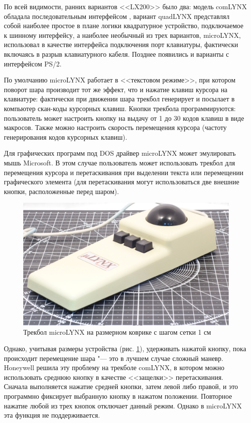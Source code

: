 \documentclass[11pt, a4paper]{article}
\begin{document}
По всей видимости, ранних вариантов <<LX200>> было два: модель comLYNX обладала последовательным интерфейсом \cite{comlynx}, вариант quadLYNX представлял собой наиболее простое в плане логики квадратурное устройство, подключаемое к шинному интерфейсу, а наиболее необычный из трех вариантов, microLYNX, использовал в качестве интерфейса подключения порт клавиатуры, фактически включаясь в разрыв клавиатурного кабеля. Позднее появились и варианты с интерфейсом PS/2.

По умолчанию microLYNX работает в <<текстовом режиме>>, при котором поворот шара производит тот же эффект, что и нажатие клавиш курсора на клавиатуре: фактически при движении шара трекбол генерирует и посылает в компьютер скан-коды курсорных клавиш. Кнопки трекбола программируются: пользователь может настроить кнопку на выдачу от 1 до 30 кодов клавиш в виде макросов. Также можно настроить скорость перемещения курсора (частоту генерирования кодов курсорных клавиш). 

Для графических программ под DOS драйвер microLYNX может эмулировать мышь Microsoft. В этом случае пользователь может использовать трекбол для перемещения курсора и перетаскивания при выделении текста или перемещении графического элемента (для перетаскивания могут использоваться две внешние кнопки, расположенные перед шаром).

\begin{figure}[h]
    \centering
    \includegraphics[scale=0.4]{1986_honeywell_microlynx_trackball/size.jpg}
    \caption{Трекбол microLYNX на размерном коврике с шагом сетки 1 см}
    \label{fig:microLYNXSize}
\end{figure}

Однако, учитывая размеры устройства (рис. \ref{fig:microLYNXSize}), удерживать нажатой кнопку, пока происходит
перемещение шара "--- это в лучшем случае сложный маневр. Honeywell решила эту проблему на трекболе comLYNX, в котором можно использовать среднюю кнопку в качестве <<защелки>> перетаскивания. Сначала выполняется нажатие средней кнопки, затем левой либо правой, и это программно фиксирует выбранную кнопку в нажатом положении. Повторное нажатие любой из трех кнопок отключает данный режим. Однако в microLYNX эта функция не поддерживается.
\end{document}
